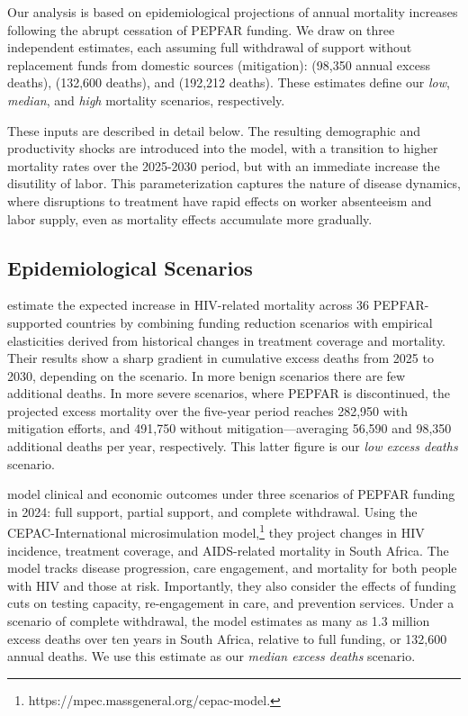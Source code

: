 \documentclass[letterpaper,12pt]{article}
\theoremstyle{definition}
\begin{document}
\begin{spacing}{1.5}
Our analysis is based on epidemiological projections of annual mortality increases following the abrupt cessation of PEPFAR funding. We draw on three independent estimates, each assuming full withdrawal of support without replacement funds from domestic sources (mitigation): \citet{Brink2025} (98,350 annual excess deaths), \citet{Gandhi2025} (132,600 deaths), and \citet{KS2025} (192,212 deaths). These estimates define our \textit{low}, \textit{median}, and \textit{high} mortality scenarios, respectively.

These inputs are described in detail below. The resulting demographic and productivity shocks are introduced into the model, with a transition to higher mortality rates over the 2025-2030 period, but with an immediate increase the disutility of labor. This parameterization captures the nature of disease dynamics, where disruptions to treatment have rapid effects on worker absenteeism and labor supply, even as mortality effects accumulate more gradually.


\subsection{Epidemiological Scenarios}

 estimate the expected increase in HIV-related mortality across 36 PEPFAR-supported countries by combining funding reduction scenarios with empirical elasticities derived from historical changes in treatment coverage and mortality. Their results show a sharp gradient in cumulative excess deaths from 2025 to 2030, depending on the scenario. In more benign scenarios there are few additional deaths. In more severe scenarios, where PEPFAR is discontinued, the projected excess mortality over the five-year period reaches 282,950 with mitigation efforts, and 491,750 without mitigation—averaging 56,590 and 98,350 additional deaths per year, respectively. This latter figure is our \textit{low excess deaths} scenario.

\citet{Gandhi2025} model clinical and economic outcomes under three scenarios of PEPFAR funding in 2024: full support, partial support, and complete withdrawal. Using the CEPAC-International microsimulation model,\footnote{https://mpec.massgeneral.org/cepac-model.} they project changes in HIV incidence, treatment coverage, and AIDS-related mortality in South Africa. The model tracks disease progression, care engagement, and mortality for both people with HIV and those at risk. Importantly, they also consider the effects of funding cuts on testing capacity, re-engagement in care, and prevention services. Under a scenario of complete withdrawal, the model estimates as many as 1.3 million excess deaths over ten years in South Africa, relative to full funding, or 132,600 annual deaths. We use this estimate as our \textit{median excess deaths} scenario. 


\end{spacing}
\end{document}
